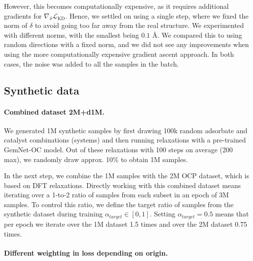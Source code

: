 \documentclass{article}
\begin{document}
However, this becomes computationally expensive, as it requires additional gradients for $\nabla_{\delta} \mathcal{L}_{\text{KD}}$. Hence, we settled on using a single step, where we fixed the norm of $\delta$ to avoid going too far away from the real structure. We experimented with different norms, with the smallest being $0.1$ \si{\angstrom}. We compared this to using random directions with a fixed norm, and we did not see any improvements when using the more computationally expensive gradient ascent approach. In both cases, the noise was added to all the samples in the batch.

\subsection{Synthetic data} 
\label{ap:synthetic}

\paragraph{Combined dataset 2M+d1M.}
We generated 1M synthetic samples by first drawing 100k random adsorbate and catalyst combinations (systems) and then running relaxations with a pre-trained GemNet-OC model. Out of these relaxations with 100 steps on average (200 max), we randomly draw approx. 10\% to obtain 1M samples.

In the next step, we combine the 1M samples with the 2M OCP dataset, which is based on DFT relaxations. Directly working with this combined dataset means iterating over a 1-to-2 ratio of samples from each subset in an epoch of 3M samples. To control this ratio, we define the target ratio of samples from the synthetic dataset during training $\alpha_{target}\in[0,1]$. Setting  $\alpha_{target}=0.5$ means that per epoch we iterate over the 1M dataset 1.5 times and over the 2M dataset 0.75 times.

\paragraph{Different weighting in loss depending on origin.}
\end{document}
